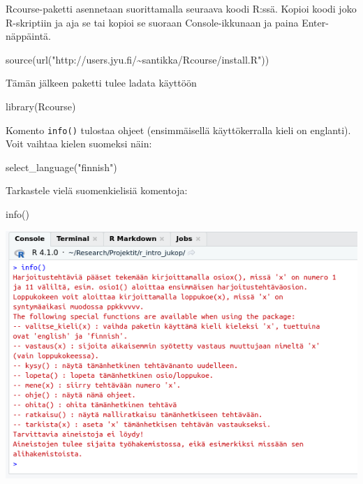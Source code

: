 \documentclass[
]{book}
\newenvironment{Shaded}{\begin{snugshade}}{\end{snugshade}}
\newcommand{\FunctionTok}[1]{\textcolor[rgb]{0.00,0.00,0.00}{#1}}
\newcommand{\NormalTok}[1]{#1}
\newcommand{\StringTok}[1]{\textcolor[rgb]{0.31,0.60,0.02}{#1}}
\begin{document}
Rcourse-paketti asennetaan suorittamalla seuraava koodi R:ssä. Kopioi koodi joko R-skriptiin ja aja se tai kopioi se suoraan Console-ikkunaan ja paina Enter-näppäintä.

\begin{Shaded}
\begin{Highlighting}[]
\FunctionTok{source}\NormalTok{(}\FunctionTok{url}\NormalTok{(}\StringTok{"http://users.jyu.fi/\textasciitilde{}santikka/Rcourse/install.R"}\NormalTok{))}
\end{Highlighting}
\end{Shaded}

Tämän jälkeen paketti tulee ladata käyttöön

\begin{Shaded}
\begin{Highlighting}[]
\FunctionTok{library}\NormalTok{(Rcourse)}
\end{Highlighting}
\end{Shaded}

Komento \texttt{info()} tulostaa ohjeet (ensimmäisellä käyttökerralla kieli on englanti). Voit vaihtaa kielen suomeksi näin:

\begin{Shaded}
\begin{Highlighting}[]
\FunctionTok{select\_language}\NormalTok{(}\StringTok{"finnish"}\NormalTok{)}
\end{Highlighting}
\end{Shaded}

Tarkastele vielä suomenkielisiä komentoja:

\begin{Shaded}
\begin{Highlighting}[]
\FunctionTok{info}\NormalTok{()}
\end{Highlighting}
\end{Shaded}

\includegraphics{files/00-start/Rcourse_package_info.png}
\end{document}
